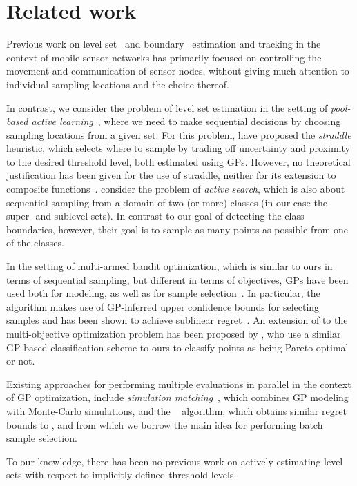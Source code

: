 \chapter{Related work} \label{ch:related}
Previous work on level set~\cite{dantu07,srinivasan08} and
boundary~\cite{singh06} estimation and tracking in the context of mobile
sensor networks has primarily focused on controlling the movement and
communication of sensor nodes, without giving much attention to
individual sampling locations and the choice thereof.

In contrast, we consider the problem of level set estimation in the setting of
\emph{pool-based active learning}~\cite{settles09}, where we need to make
sequential decisions by choosing sampling locations from a given set.
For this problem, \citet{bryan05} have proposed the
\emph{straddle} heuristic, which selects where to sample by trading off
uncertainty and proximity to the desired threshold level, both estimated
using GPs.
However, no theoretical justification has been given for the use of straddle,
neither for its extension to composite functions~\cite{bryan08}.
\citet{garnett12} consider the problem of
\emph{active search}, which is also about sequential sampling from a domain of
two (or more) classes (in our case the super- and sublevel sets).
In contrast to our goal of detecting the class boundaries, however,
their goal is to sample as many points as possible from one of the classes.

In the setting of multi-armed bandit optimization, which is similar to ours
in terms of sequential sampling, but different in terms of objectives,
GPs have been used both for modeling, as well as for sample
selection~\mbox{\cite{brochu10}}. In particular, the \gpucb algorithm
makes use of GP-inferred upper confidence bounds for selecting samples and
has been shown to achieve sublinear regret~\cite{srinivas10}.
An extension of \gpucb to the multi-objective
optimization problem has been proposed by
\citet{zuluaga13}, who use a similar GP-based
classification scheme to ours to classify points as being Pareto-optimal
or not.

Existing approaches for performing multiple evaluations in
parallel in the context of GP optimization, include
\emph{simulation matching}~\cite{azimi10}, which combines GP modeling with
Monte-Carlo simulations, and the \gpbucb~\cite{desautels12} algorithm,
which obtains similar regret bounds to \gpucb, and from which we borrow
the main idea for performing batch sample selection.

To our knowledge, there has been no previous work on actively estimating
level sets with respect to implicitly defined threshold levels.